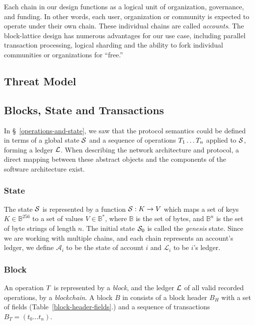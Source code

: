 Each chain in our design functions as a logical unit of organization,
governance, and funding. In other words, each user, organization or community
is expected to operate under their own chain. These individual chains are
called \emph{accounts}. The block-lattice design has numerous advantages for
our use case, including parallel transaction processing, logical sharding and
the ability to fork individual communities or organizations for ``free.''

\subsection{Threat Model}
\todo{}

\subsection{Blocks, State and Transactions}

In \S~\ref{operations-and-state}, we saw that the protocol semantics could
be defined in terms of a global state $\mathcal{S}$ and a sequence of operations
$T_1 \dotso T_n$ applied to $\mathcal{S}$, forming a ledger $\mathcal{L}$. When
describing the network architecture and protocol, a direct mapping between
these abstract objects and the components of the software architecture exist.

\subsubsection{State}

The state $\mathcal{S}$ is represented by a function $\mathcal{S} : K \to V$ which maps a
set of keys $K \in \mathbb{B}^{256}$ to a set of values $V \in \mathbb{B}^{*}$,
where $\mathbb{B}$ is the set of bytes, and $\mathbb{B}^n$ is the set of byte
strings of length $n$. The initial state $\mathcal{S}_0$ is called the
\emph{genesis} state. Since we are working with multiple chains, and each
chain represents an account's ledger, we define $\mathcal{A}_i$ to be the state
of account $i$ and $\mathcal{L}_i$ to be $i$'s ledger.

\subsubsection{Block}

An operation $T$ is represented by a \emph{block}, and the ledger $\mathcal{L}$
of all valid recorded operations, by a \emph{blockchain}. A block $B$ in
\oscoin{} consists of a block header $B_H$ with a set of fields
(Table~\ref{block-header-fields}.) and a sequence of transactions $B_T = (t_0 \dotso
t_n)$.


